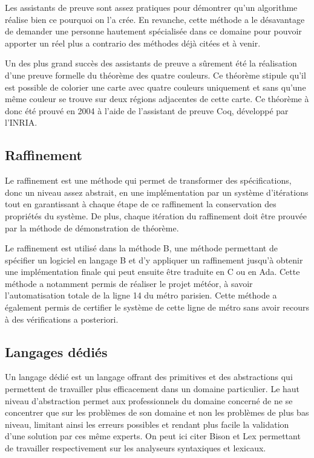 \documentclass[12pt]{report}
\begin{document}
Les assistants de preuve sont assez pratiques pour démontrer qu'un algorithme réalise bien ce pourquoi on l'a crée. En revanche, cette méthode a le désavantage de demander une personne hautement spécialisée dans ce domaine pour pouvoir apporter un réel plus a contrario des méthodes déjà citées et à venir\cite{griffault}.

Un des plus grand succès des assistants de preuve a sûrement été la réalisation d'une preuve formelle du théorème des quatre couleurs. Ce théorème stipule qu'il est possible de colorier une carte avec quatre couleurs uniquement et sans qu'une même couleur se trouve sur deux régions adjacentes de cette carte. Ce théorème à donc été prouvé en 2004 à l'aide de l'assistant de preuve Coq, développé par l'INRIA\cite{delahaye}.     

\subsection{Raffinement}

Le raffinement est une méthode qui permet de transformer des spécifications, donc un niveau assez abstrait, en une implémentation par un système d'itérations tout en garantissant à chaque étape de ce raffinement la conservation des propriétés du système. De plus, chaque itération du raffinement doit être prouvée par la méthode de démonstration de théorème.

Le raffinement est utilisé dans la méthode B, une méthode permettant de spécifier un logiciel en langage B et d'y appliquer un raffinement jusqu'à obtenir une implémentation finale qui peut ensuite être traduite en C ou en Ada. Cette méthode a notamment permis de réaliser le projet météor, à savoir l'automatisation totale de la ligne 14 du métro parisien. Cette méthode a également permis de certifier le système de cette ligne de métro sans avoir recours à des vérifications a posteriori\cite{griffault}.   
   
\subsection{Langages dédiés}
Un langage dédié est un langage offrant des primitives et des abstractions qui permettent de travailler plus efficacement dans un domaine particulier. Le haut niveau d'abstraction permet aux professionnels du domaine concerné de ne se concentrer que sur les problèmes de son domaine et non les problèmes de plus bas niveau, limitant ainsi les erreurs possibles et rendant plus facile la validation d'une solution par ces même experts\cite{Deuklvi}. On peut ici citer Bison et Lex permettant de travailler respectivement sur les analyseurs syntaxiques et lexicaux.
\end{document}
